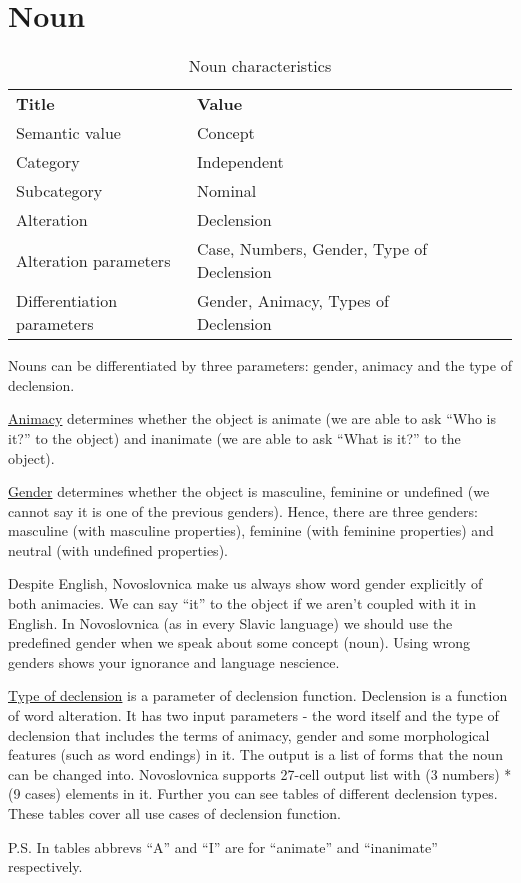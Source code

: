 \section{Noun}

\begin{table}[h]
	\caption{Noun characteristics}
	\begin{tabular}{lllll}
		\textbf{Title}              & \textbf{Value}                            \\
		Semantic value              & Concept                                   \\
		Category                    & Independent                               \\
		Subcategory                 & Nominal                                   \\
		Alteration                  & Declension                                \\
		Alteration parameters       & Case, Numbers, Gender, Type of Declension \\
		Differentiation parameters  & Gender, Animacy, Types of  Declension                                  
	\end{tabular}
\end{table}

Nouns can be differentiated by three parameters: gender, animacy and the type of declension.

\underline{Animacy} determines whether the object is animate (we are able to ask “Who is it?” to the object) and inanimate (we are able to ask “What is it?” to the object).

\underline{Gender} determines whether the object is masculine, feminine or undefined (we cannot say it is one of the previous genders). Hence, there are three genders: masculine (with masculine properties), feminine (with feminine properties) and neutral (with undefined properties).

Despite English, Novoslovnica make us always show word gender explicitly of both animacies. We can say “it” to the object if we aren’t coupled with it in English. In Novoslovnica (as in every Slavic language) we should use the predefined gender when we speak about some concept (noun). Using wrong genders shows your ignorance and language nescience.

\underline{Type of declension} is a parameter of declension function. Declension is a function of word alteration. It has two input parameters - the word itself and the type of declension that includes the terms of animacy, gender and some morphological features (such as word endings) in it. The output is a list of forms that the noun can be changed into. Novoslovnica supports 27-cell output list with (3 numbers) * (9 cases) elements in it. Further you can see tables of different declension types. These tables cover all use cases of declension function.

P.S. In tables abbrevs “A” and “I” are for “animate” and “inanimate” respectively.

